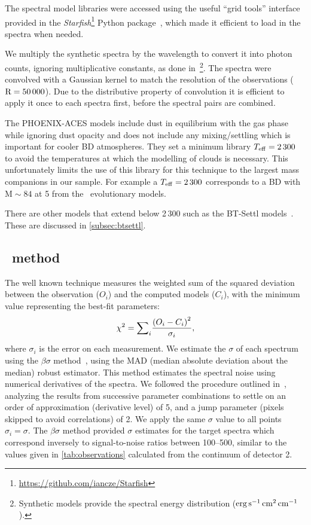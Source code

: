

The spectral model libraries were accessed using the useful ``grid tools'' interface provided in the \emph{Starfish}\footnote{\url{https://github.com/iancze/Starfish}} Python package~\citep{czekala_constructing_2015}, which made it efficient to load in the spectra when needed.

We multiply the synthetic spectra by the wavelength to convert it into photon counts, ignoring multiplicative constants, as done in~\citet{figueira_radial_2016}\footnote{Synthetic models provide the spectral energy distribution (\(\rm erg\,s^{-1}\,cm^{2}\,cm^{-1}\)).}.
The spectra were convolved with a Gaussian kernel to match the resolution of the observations (\(\rm R=50\,000\)).
Due to the distributive property of convolution it is efficient to apply it once to each spectra first, before the spectral pairs are combined.

The {PHOENIX-ACES} models include dust in equilibrium with the gas phase while ignoring dust opacity and does not include any mixing/settling which is important for cooler {BD} atmospheres.
They set a minimum library \(T_{\mathrm{eff}}{}=2\,300\)\K{} to avoid the temperatures at which the modelling of clouds is necessary.
This unfortunately limits the use of this library for this technique to the largest mass companions in our sample.
For example a \(T_{\mathrm{eff}}{}=2\,300\)\K{} corresponds to a {BD} with \(\textrm{M}\sim84\)\Mjup{} at 5\Gyr{} from the~\citet{baraffe_evolutionary_2003} evolutionary models.

There are other models that extend below 2\,300\K{} such as the {BT-Settl} models~\citep{allard_btsettl_2013, baraffe_new_2015}.
These are discussed in \cref{subsec:btsettl}.


\subsection{\texorpdfstring{\textchisquared}\ \ method}
\label{subsec:chi2}
The well known \textchisquared{} technique measures the weighted sum of the squared deviation between the observation (\({O}_{i}\)) and the computed models (\(C_{i}\)), with the minimum \textchisquared{} value representing the best-fit parameters:
\[{\chi}^{2} = {\sum}_i \frac{{(O_{i} - C_{i})}^2}{{\sigma}_{i}},\] where \({\sigma}_{i}\) is the error on each measurement.
We estimate the \(\sigma\) of each spectrum using the \(\beta\sigma\) method~\citep{czesla_posteriori_2018}, using the MAD (median absolute deviation about the median) robust estimator. {\red{} This method estimates the spectral noise using numerical derivatives of the spectra.
We followed the procedure outlined in~\citet{czesla_posteriori_2018}, analyzing the results from successive parameter combinations to settle on an order of approximation (derivative level) of 5, and a jump parameter (pixels skipped to avoid correlations) of 2.} We apply the same \(\sigma\) value to all points \({\sigma}_{i} = \sigma\).
The \(\beta\sigma\) method provided \(\sigma\) estimates for the target spectra which correspond inversely to signal-to-noise ratios between 100--500, {\red{} similar to the values given in \cref{tab:observations} calculated from the continuum of detector 2.}

